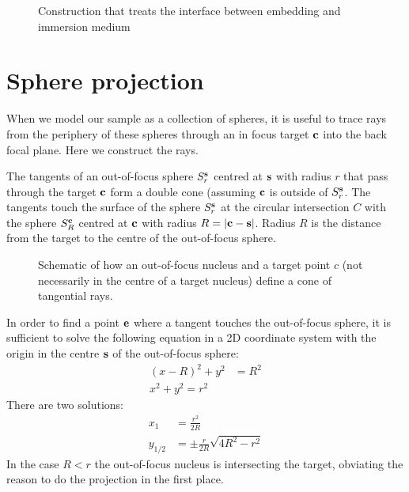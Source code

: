  \begin{figure}[!hbt]
   \centering
   
   \caption{Construction that treats the interface between embedding
     and immersion medium}
 \end{figure}
\section{Sphere projection}
\label{sec:sphere-projection}
When we model our sample as a collection of spheres, it is useful to
trace rays from the periphery of these spheres through an in focus
target $\mathbf{c}$ into the back focal plane. Here we construct the rays.

The tangents of an out-of-focus sphere $S^{\mathbf{s}}_r$ centred at $\mathbf{s}$ with
radius $r$ that pass through the target $\mathbf{c}$ form a double cone
(assuming $\mathbf{c}$ is outside of $S^{\mathbf{s}}_r$. The tangents touch the surface
of the sphere $S^{\mathbf{s}}_r$ at the circular intersection $C$ with the sphere
$S^{\mathbf{c}}_R$ centred at $\mathbf{c}$ with radius $R=\mathopen| \mathbf{c}-\mathbf{s} \mathclose|$. Radius $R$ is
the distance from the target to the centre of the out-of-focus sphere.
\begin{figure}[!hbt]
  \centering
  
  \caption{Schematic of how an out-of-focus nucleus and a target point
    $c$ (not necessarily in the centre of a target nucleus) define a
    cone of tangential rays.}
\end{figure}
In order to find a point $\mathbf{e}$ where a tangent touches the out-of-focus
sphere, it is sufficient to solve the following equation in a 2D
coordinate system with the origin in the centre $\mathbf{s}$ of the
out-of-focus sphere:
\begin{align}
  (x-R)^2+y^2&=R^2\\
  x^2+y^2=r^2
\end{align}
There are two solutions:
\begin{align}
  x_1&=\frac{r^2}{2R}\label{eqn:x1}\\ 
  y_{1/2}&=\pm\frac{r}{2R}\sqrt{4R^2-r^2} \label{eqn:y1}
\end{align}
In the case $R<r$ the out-of-focus nucleus is intersecting the target,
obviating the reason to do the projection in the first place.

